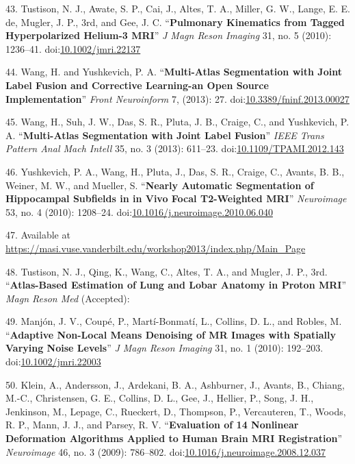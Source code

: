 \documentclass[11pt,]{article}
\begin{document}
43. Tustison, N. J., Awate, S. P., Cai, J., Altes, T. A., Miller, G. W.,
Lange, E. E. de, Mugler, J. P., 3rd, and Gee, J. C. ``\textbf{Pulmonary
Kinematics from Tagged Hyperpolarized Helium-3 MRI}'' \emph{J Magn Reson
Imaging} 31, no. 5 (2010): 1236--41.
doi:\href{http://dx.doi.org/10.1002/jmri.22137}{10.1002/jmri.22137}

44. Wang, H. and Yushkevich, P. A. ``\textbf{Multi-Atlas Segmentation
with Joint Label Fusion and Corrective Learning-an Open Source
Implementation}'' \emph{Front Neuroinform} 7, (2013): 27.
doi:\href{http://dx.doi.org/10.3389/fninf.2013.00027}{10.3389/fninf.2013.00027}

45. Wang, H., Suh, J. W., Das, S. R., Pluta, J. B., Craige, C., and
Yushkevich, P. A. ``\textbf{Multi-Atlas Segmentation with Joint Label
Fusion}'' \emph{IEEE Trans Pattern Anal Mach Intell} 35, no. 3 (2013):
611--23.
doi:\href{http://dx.doi.org/10.1109/TPAMI.2012.143}{10.1109/TPAMI.2012.143}

46. Yushkevich, P. A., Wang, H., Pluta, J., Das, S. R., Craige, C.,
Avants, B. B., Weiner, M. W., and Mueller, S. ``\textbf{Nearly Automatic
Segmentation of Hippocampal Subfields in in Vivo Focal T2-Weighted
MRI}'' \emph{Neuroimage} 53, no. 4 (2010): 1208--24.
doi:\href{http://dx.doi.org/10.1016/j.neuroimage.2010.06.040}{10.1016/j.neuroimage.2010.06.040}

47. Available at
\url{https://masi.vuse.vanderbilt.edu/workshop2013/index.php/Main_Page}

48. Tustison, N. J., Qing, K., Wang, C., Altes, T. A., and Mugler, J.
P., 3rd. ``\textbf{Atlas-Based Estimation of Lung and Lobar Anatomy in
Proton MRI}'' \emph{Magn Reson Med} (Accepted):

49. Manj{ó}n, J. V., Coup{é}, P., Mart{í}-Bonmat{í}, L., Collins, D. L.,
and Robles, M. ``\textbf{Adaptive Non-Local Means Denoising of MR Images
with Spatially Varying Noise Levels}'' \emph{J Magn Reson Imaging} 31,
no. 1 (2010): 192--203.
doi:\href{http://dx.doi.org/10.1002/jmri.22003}{10.1002/jmri.22003}

50. Klein, A., Andersson, J., Ardekani, B. A., Ashburner, J., Avants,
B., Chiang, M.-C., Christensen, G. E., Collins, D. L., Gee, J., Hellier,
P., Song, J. H., Jenkinson, M., Lepage, C., Rueckert, D., Thompson, P.,
Vercauteren, T., Woods, R. P., Mann, J. J., and Parsey, R. V.
``\textbf{Evaluation of 14 Nonlinear Deformation Algorithms Applied to
Human Brain MRI Registration}'' \emph{Neuroimage} 46, no. 3 (2009):
786--802.
doi:\href{http://dx.doi.org/10.1016/j.neuroimage.2008.12.037}{10.1016/j.neuroimage.2008.12.037}
\end{document}
